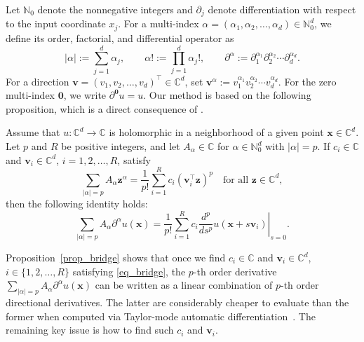 \documentclass[final,oneeqnum]{siamltex}
\newcommand{\C}{\mathbb{C}}
\newcommand{\N}{\mathbb{N}}
\newcommand{\bx}{\bm{x}}
\newcommand{\bz}{\bm{z}}
\newcommand{\bv}{\bm{v}}
\newcommand{\abs}[1]{\left|#1\right|}
\begin{document}
Let $\N_0$ denote the nonnegative integers and $\partial_j$ denote differentiation with respect to the input coordinate $x_j$.
For a multi-index $\alpha = (\alpha_1, \alpha_2, \ldots, \alpha_d) \in \N_0^d$, we define its order, factorial, and differential operator as
\begin{equation}\label{eq_multiindex}
    \abs{\alpha} := \sum_{j = 1}^{d} \alpha_j, \quad\quad \alpha! := \prod_{j = 1}^{d} \alpha_j!, \quad\quad \partial^{\alpha} := \partial_1^{\alpha_1} \partial_2^{\alpha_2} \cdots \partial_d^{\alpha_d}.
\end{equation}
For a direction $\bv = (v_1, v_2, \ldots, v_d)^\top \in \C^d$, set $\bv^\alpha := v_1^{\alpha_1} v_2^{\alpha_2} \cdots v_d^{\alpha_d}$.
For the zero multi-index $\boldsymbol{0}$, we write $\partial^{\boldsymbol{0}} u = u$.
Our method is based on the following proposition, which is a direct consequence of \cite[Sec.~2]{CCG2012}.

\begin{proposition}\label{prop_bridge}
    Assume that $u : \C^d \to \C$ is holomorphic in a neighborhood of a given point $\bx \in \C^d$.
    Let $p$ and $R$ be positive integers, and let $A_{\alpha} \in \C$ for $\alpha \in \N_0^d$ with $\abs{\alpha} = p$.
    If $c_i \in \C$ and $\bv_i \in \C^d$, $i = 1, 2, \ldots, R$, satisfy
    \begin{equation}\label{eq_bridge}
        \sum_{\abs{\alpha} = p} A_{\alpha} \bz^\alpha = \frac{1}{p!} \sum_{i = 1}^{R} c_i (\bv_i^\top \bz)^p \quad \text{for all } \bz \in \C^d,
    \end{equation}
    then the following identity holds:
    \begin{equation}\label{eq_schedule}
        \sum_{\abs{\alpha} = p} A_{\alpha} \partial^\alpha u(\bx) = \frac{1}{p!} \sum_{i = 1}^{R} c_i \left.\frac{d^p}{d s^p} u(\bx + s \bv_i)\right|_{s = 0}.
    \end{equation}
\end{proposition}

Proposition~\ref{prop_bridge} shows that once we find $c_i \in \C$ and $\bv_i \in \C^d$, $i \in \{1, 2, \ldots, R\}$ satisfying \eqref{eq_bridge}, the $p$-th order derivative $\sum_{\abs{\alpha} = p} A_{\alpha} \partial^\alpha u(\bx)$ can be written as a linear combination of $p$-th order directional derivatives.
The latter are considerably cheaper to evaluate than the former when computed via Taylor-mode automatic differentiation~\cite{Shi2024stde}.
The remaining key issue is how to find such $c_i$ and $\bv_i$.
\end{document}
